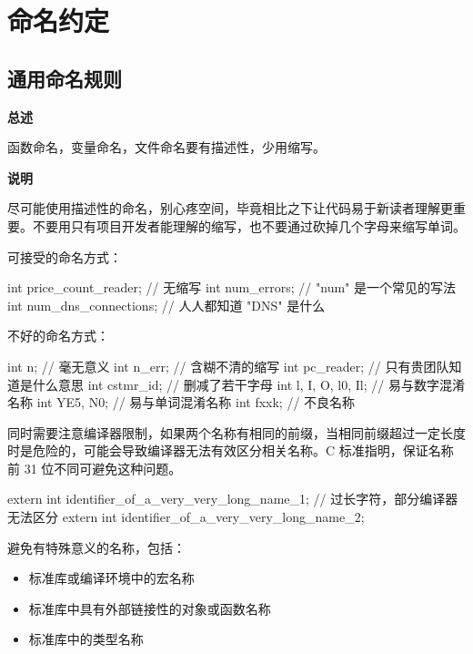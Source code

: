 \chapter{命名约定}

\section{通用命名规则} \label{c-general-naming-rules}

\textbf{总述}

函数命名，变量命名，文件命名要有描述性，少用缩写。

\textbf{说明}

尽可能使用描述性的命名，别心疼空间，毕竟相比之下让代码易于新读者理解更重要。不要用只有项目开发者能理解的缩写，也不要通过砍掉几个字母来缩写单词。

可接受的命名方式：

\begin{ccode}
int price_count_reader;     // 无缩写
int num_errors;             // "num" 是一个常见的写法
int num_dns_connections;    // 人人都知道 "DNS" 是什么
\end{ccode}

不好的命名方式：

\begin{ccode}
int n;                    // 毫无意义
int n_err;                // 含糊不清的缩写
int pc_reader;            // 只有贵团队知道是什么意思
int cstmr_id;             // 删减了若干字母
int l, I, O, l0, Il;      // 易与数字混淆名称
int YE5, N0;              // 易与单词混淆名称
int fxxk;                 // 不良名称
\end{ccode}

同时需要注意编译器限制，如果两个名称有相同的前缀，当相同前缀超过一定长度时是危险的，可能会导致编译器无法有效区分相关名称。C 标准指明，保证名称前 31 位不同可避免这种问题。

\begin{ccode}
extern int identifier_of_a_very_very_long_name_1;  // 过长字符，部分编译器无法区分
extern int identifier_of_a_very_very_long_name_2;
\end{ccode}

避免有特殊意义的名称，包括：

\begin{itemize}
  \item 标准库或编译环境中的宏名称
  \item 标准库中具有外部链接性的对象或函数名称
  \item 标准库中的类型名称
\end{itemize}

